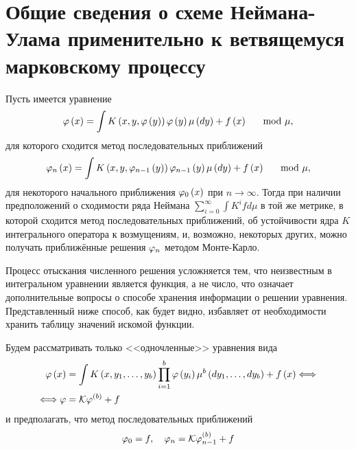 \section{Общие сведения о схеме Неймана-Улама применительно к ветвящемуся марковскому процессу}\label{sec:neyman-ulam}
Пусть имеется уравнение 
\begin{equation}
	\varphi\left(x\right) = \int K\left(x, y, \varphi\left(y\right)\right)\varphi\left(y\right) \mu\left(dy\right) + f\left(x\right) \quad \mod \mu,
\end{equation}
для которого сходится метод последовательных приближений
\begin{equation}
	\varphi_n\left(x\right) = \int K\left(x, y, \varphi_{n-1}\left(y\right)\right)\varphi_{n-1}\left(y\right) \mu\left(dy\right) + f\left(x\right) \quad \mod \mu,
\end{equation}
для некоторого начального приближения $\varphi_0\left(x\right)$ при $n\to\infty$. Тогда при наличии предположений о сходимости ряда Неймана $\sum_{i=0}^\infty \int K^i f d\mu$ в той же метрике, в которой сходится метод последовательных приближений, об устойчивости ядра $K$ интегрального оператора к возмущениям, и, возможно, некоторых других, можно получать приближённые решения $\varphi_n$ методом Монте-Карло.

Процесс отыскания численного решения усложняется тем, что неизвестным в интегральном уравнении является функция, а не число, что означает дополнительные вопросы о способе хранения информации о решении уравнения. Представленный ниже способ, как будет видно, избавляет от необходимости хранить таблицу значений искомой функции.

Будем рассматривать только <<одночленные>> уравнения вида 
\begin{align}
	\varphi\left(x\right) &= \int K\left(x, y_1, \ldots,y_b\right)\prod_{i=1}^b\varphi\left(y_i\right)\mu^b\left(dy_1, \ldots,dy_b\right) + f\left(x\right) \Longleftrightarrow \label{eq:tree-basic}\\
	\Longleftrightarrow \varphi &= \mathcal{K}\varphi^{\left(b\right)} + f \nonumber
\end{align}
и предполагать, что метод последовательных приближений 
\begin{equation}
\label{eq:consecutive-approximations}
\varphi_0 = f, \quad\varphi_n = \mathcal{K}\varphi_{n-1}^{(b)} + f
\end{equation}

